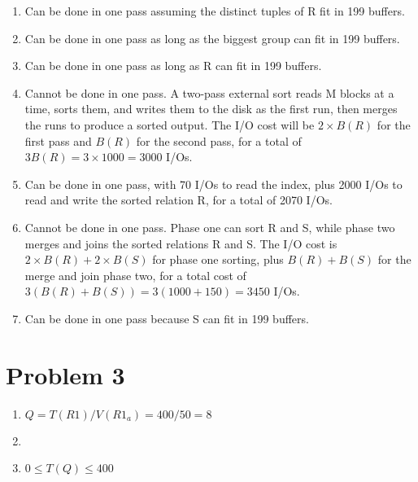 \documentclass[a4paper, 12pt]{article}
\begin{document}
\begin{enumerate}[label=(\alph*)]
	\item Can be done in one pass assuming the distinct tuples of R fit in 199
		buffers.
	\item Can be done in one pass as long as the biggest group can fit in 199
		buffers.
	\item Can be done in one pass as long as R can fit in 199 buffers.
	\item Cannot be done in one pass. A two-pass external sort reads M blocks at
		a time, sorts them, and writes them to the disk as the first run, then
		merges the runs to produce a sorted output. The I/O cost will be $ 2
		\times B(R) $ for the first pass and $ B(R) $ for the second pass, for a
		total of $ 3 B(R) = 3 \times 1000 = 3000 $ I/Os.
	\item Can be done in one pass, with 70 I/Os to read the index, plus 2000
		I/Os to read and write the sorted relation R, for a total of 2070 I/Os.
	\item Cannot be done in one pass. Phase one can sort R and S, while phase
		two merges and joins the sorted relations R and S. The I/O cost is $ 2
		\times B(R) + 2 \times B(S) $ for phase one sorting, plus $ B(R) + B(S)
		$ for the merge and join phase two, for a total cost of $ 3 ( B(R) +
		B(S)) = 3 ( 1000 + 150 ) = 3450 $ I/Os.
	\item Can be done in one pass because S can fit in 199 buffers.
\end{enumerate}

\section*{Problem 3}

\begin{enumerate}
	\item $ Q = T(R1) / V(R1_a) = 400 / 50 = 8 $
	\item 
	\item $ 0 \leq T(Q) \leq 400 $
\end{enumerate}
\end{document}
